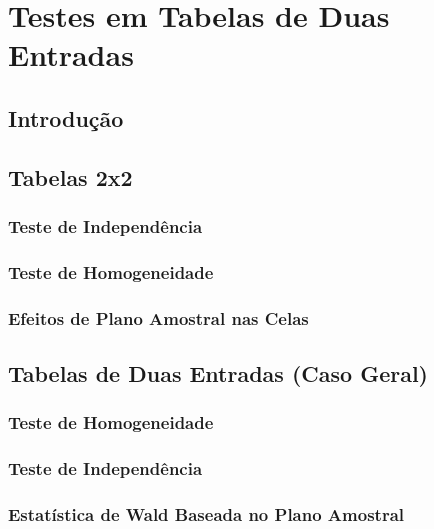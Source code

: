 \documentclass[]{book}
\theoremstyle{definition}
\theoremstyle{definition}
\theoremstyle{definition}
\theoremstyle{remark}
\begin{document}
\chapter{Testes em Tabelas de Duas Entradas}\label{testetab2}

\section{Introdução}\label{introducao-2}

\section{Tabelas 2x2}\label{tabelas22}

\subsection{Teste de Independência}\label{teste-de-independencia}

\subsection{Teste de Homogeneidade}\label{teste-de-homogeneidade}

\subsection{Efeitos de Plano Amostral nas
Celas}\label{efeitos-de-plano-amostral-nas-celas}

\section{Tabelas de Duas Entradas (Caso
Geral)}\label{tabelas-de-duas-entradas-caso-geral}

\subsection{Teste de Homogeneidade}\label{teste-de-homogeneidade-1}

\subsection{Teste de Independência}\label{teste-de-independencia-1}

\subsection{Estatística de Wald Baseada no Plano
Amostral}\label{estatistica-de-wald-baseada-no-plano-amostral-1}
\end{document}

